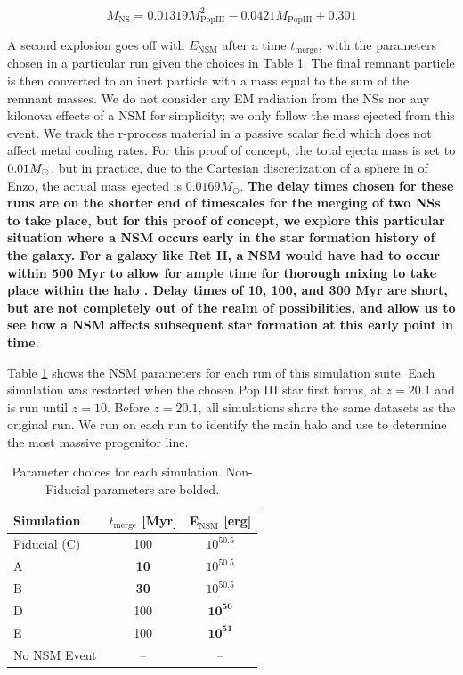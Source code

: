 \documentclass[fleqn,usenatbib]{mnras}
\begin{document}
\begin{equation} \label{eq:nsm_mass}
	M_{\mathrm{NS}} = 0.01319 M_{\mathrm{PopIII}}^{2} - 0.0421 M_{\mathrm{PopIII}} + 0.301
\end{equation}

A second explosion goes off with $E_{\textrm{NSM}}$ after a time $t_{\textrm{merge}}$, with the parameters chosen in a particular run given the choices in Table \ref{tab:NSM_params}. The final remnant particle is then converted to an inert particle with a mass equal to the sum of the remnant masses. We do not consider any EM radiation from the NSs nor any kilonova effects of a NSM for simplicity; we only follow the mass ejected from this event. We track the r-process material in a passive scalar field which does not affect metal cooling rates. For this proof of concept, the total ejecta mass is set to $0.01 \Ms$, but in practice, due to the Cartesian discretization of a sphere in of Enzo, the actual mass ejected is $0.0169 M_{\odot}$. \textbf{The delay times chosen for these runs are on the shorter end of timescales for the merging of two NSs to take place, but for this proof of concept, we explore this particular situation where a NSM occurs early in the star formation history of the galaxy. For a galaxy like Ret II, a NSM would have had to occur within 500 Myr to allow for ample time for thorough mixing to take place within the halo \citep{Simon23}. Delay times of 10, 100, and 300 Myr are short, but are not completely out of the realm of possibilities, and allow us to see how a NSM affects subsequent star formation at this early point in time.} 

Table \ref{tab:NSM_params} shows the NSM parameters for each run of this simulation suite. Each simulation was restarted when the chosen Pop III star first forms, at $z = 20.1$ and is run until $z = 10$. Before $z = 20.1$, all simulations share the same datasets as the original run. We run \rockstar{} \citep{rockstar} on each run to identify the main halo and use \ytree{} \citep{ytree} to determine the most massive progenitor line.

\begin{table}
	\centering
	\begin{tabular}{lcc} 
		\hline
		Simulation & $t_{\textrm{merge}}$ [Myr] & E$_{\textrm{NSM}}$ [erg] \\
		\hline
		Fiducial (C) & 100 & $10^{50.5}$ \\
		A & \textbf{10} & $10^{50.5}$ \\
		B & \textbf{30} & $10^{50.5}$ \\
		D & 100 & $\mathbf{10^{50}}$ \\
		E & 100 & $\mathbf{10^{51}}$ \\
		No NSM Event & -- & -- \\
		\hline
	\end{tabular}
	\caption{Parameter choices for each simulation. Non-Fiducial parameters are bolded.}
	\label{tab:NSM_params}
\end{table}
\end{document}
